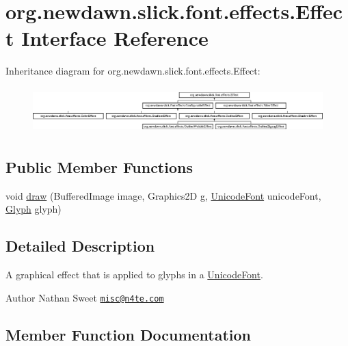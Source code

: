 \hypertarget{interfaceorg_1_1newdawn_1_1slick_1_1font_1_1effects_1_1_effect}{}\section{org.\+newdawn.\+slick.\+font.\+effects.\+Effect Interface Reference}
\label{interfaceorg_1_1newdawn_1_1slick_1_1font_1_1effects_1_1_effect}
Inheritance diagram for org.\+newdawn.\+slick.\+font.\+effects.\+Effect\+:\begin{figure}[H]
\begin{center}
\leavevmode
\includegraphics[height=1.800643cm]{interfaceorg_1_1newdawn_1_1slick_1_1font_1_1effects_1_1_effect}
\end{center}
\end{figure}
\subsection*{Public Member Functions}
\begin{DoxyCompactItemize}
\item 
void \mbox{\hyperlink{interfaceorg_1_1newdawn_1_1slick_1_1font_1_1effects_1_1_effect_a234db1cd6151bdbe9fda2099ee71eafb}{draw}} (Buffered\+Image image, Graphics2D g, \mbox{\hyperlink{classorg_1_1newdawn_1_1slick_1_1_unicode_font}{Unicode\+Font}} unicode\+Font, \mbox{\hyperlink{classorg_1_1newdawn_1_1slick_1_1font_1_1_glyph}{Glyph}} glyph)
\end{DoxyCompactItemize}


\subsection{Detailed Description}
A graphical effect that is applied to glyphs in a \mbox{\hyperlink{classorg_1_1newdawn_1_1slick_1_1_unicode_font}{Unicode\+Font}}.

\begin{DoxyAuthor}{Author}
Nathan Sweet \href{mailto:misc@n4te.com}{\tt misc@n4te.\+com} 
\end{DoxyAuthor}


\subsection{Member Function Documentation}
\mbox{\label{interfaceorg_1_1newdawn_1_1slick_1_1font_1_1effects_1_1_effect_a234db1cd6151bdbe9fda2099ee71eafb}} 
